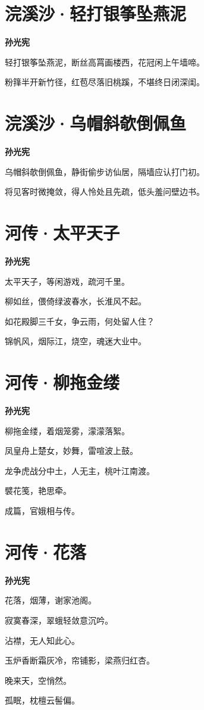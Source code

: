 \documentclass[12pt,a4paper]{ctexbook}
\begin{document}
\section{浣溪沙·轻打银筝坠燕泥}
\textbf{孙光宪}\par\vspace{0.5em}
轻打银筝坠燕泥，断丝高罥画楼西，花冠闲上午墙啼。\par
粉箨半开新竹径，红苞尽落旧桃蹊，不堪终日闭深闺。\par

\section{浣溪沙·乌帽斜欹倒佩鱼}
\textbf{孙光宪}\par\vspace{0.5em}
乌帽斜欹倒佩鱼，静街偷步访仙居，隔墙应认打门初。\par
将见客时微掩敛，得人怜处且先疏，低头羞问壁边书。\par

\section{河传·太平天子}
\textbf{孙光宪}\par\vspace{0.5em}
太平天子，等闲游戏，疏河千里。\par
柳如丝，偎倚绿波春水，长淮风不起。\par
如花殿脚三千女，争云雨，何处留人住？\par
锦帆风，烟际江，烧空，魂迷大业中。\par

\section{河传·柳拖金缕}
\textbf{孙光宪}\par\vspace{0.5em}
柳拖金缕，着烟笼雾，濛濛落絮。\par
凤皇舟上楚女，妙舞，雷喧波上鼓。\par
龙争虎战分中土，人无主，桃叶江南渡。\par
襞花笺，艳思牵。\par
成篇，官娥相与传。\par

\section{河传·花落}
\textbf{孙光宪}\par\vspace{0.5em}
花落，烟薄，谢家池阁。\par
寂寞春深，翠蛾轻敛意沉吟。\par
沾襟，无人知此心。\par
玉炉香断霜灰冷，帘铺影，梁燕归红杏。\par
晚来天，空悄然。\par
孤眠，枕檀云髻偏。\par
\end{document}
